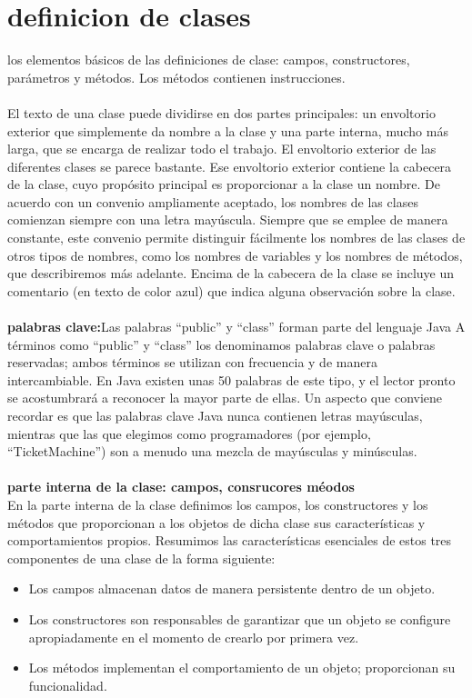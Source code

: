 \documentclass[11pt,a4paper]{article}
\begin{document}
	\section{definicion de clases}
	los elementos básicos de las definiciones de clase: campos, constructores, parámetros y
	métodos. Los métodos contienen instrucciones.\\
	\\
	El texto de una clase puede dividirse en dos partes principales: un envoltorio exterior que simplemente
	da nombre a la clase y una parte interna, mucho más larga, que se encarga de realizar todo
	el trabajo. El envoltorio exterior de las diferentes clases se parece bastante. Ese envoltorio exterior contiene
	la cabecera de la clase, cuyo propósito principal es proporcionar a la clase un nombre. De acuerdo
	con un convenio ampliamente aceptado, los nombres de las clases comienzan siempre con una
	letra mayúscula. Siempre que se emplee de manera constante, este convenio permite distinguir
	fácilmente los nombres de las clases de otros tipos de nombres, como los nombres de variables y
	los nombres de métodos, que describiremos más adelante. Encima de la cabecera de la clase se
	incluye un comentario (en texto de color azul) que indica alguna observación sobre la clase.\\
	\\
	\textbf{palabras clave:}Las palabras “public” y “class” forman parte del lenguaje Java 
	A términos como “public” y
	“class” los denominamos palabras clave o palabras reservadas; ambos términos se utilizan con
	frecuencia y de manera intercambiable. En Java existen unas 50 palabras de este tipo, y el lector
	pronto se acostumbrará a reconocer la mayor parte de ellas. Un aspecto que conviene recordar
	es que las palabras clave Java nunca contienen letras mayúsculas, mientras que las que elegimos
	como programadores (por ejemplo, “TicketMachine”) son a menudo una mezcla de mayúsculas y
	minúsculas.
	\\
	\\
	\textbf{parte interna de la clase: campos, consrucores  méodos}
	\\
	En la parte interna de la clase definimos los campos, los constructores y los métodos que proporcionan
	a los objetos de dicha clase sus características y comportamientos propios. Resumimos las
	características esenciales de estos tres componentes de una clase de la forma siguiente:
	\begin{itemize}
		\item Los campos almacenan datos de manera persistente dentro de un objeto.
		\item 
		Los constructores son responsables de garantizar que un objeto se configure apropiadamente en
		el momento de crearlo por primera vez.
		\item 
		Los métodos implementan el comportamiento de un objeto; proporcionan su funcionalidad. 
	\end{itemize}
\end{document}
